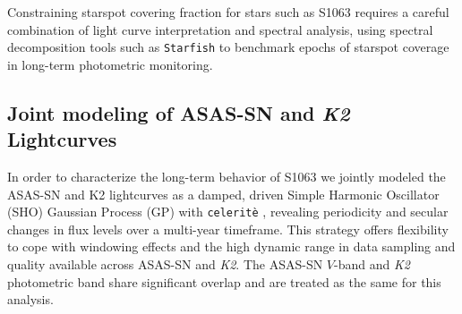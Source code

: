 \documentclass[modern,trackchanges]{aastex631}
\begin{document}

Constraining starspot covering fraction for stars such as S1063 requires a careful combination of light curve interpretation and spectral analysis, using spectral decomposition tools such as \texttt{Starfish} \citep{czekala15} to benchmark epochs of starspot coverage in long-term photometric monitoring. 

\subsection{Joint modeling of ASAS-SN and \emph{K2} Lightcurves}
In order to characterize the long-term behavior of S1063 we jointly modeled the ASAS-SN and K2 lightcurves as a damped, driven Simple Harmonic Oscillator (SHO) Gaussian Process (GP) with \texttt{celerit\`e} \citep{2017AJ....154..220F}, revealing periodicity and secular changes in flux levels over a multi-year timeframe.  This strategy offers flexibility to cope with windowing effects and the high dynamic range in data sampling and quality available across ASAS-SN and \emph{K2}.  The ASAS-SN $V$-band and \emph{K2} photometric band share significant overlap and are treated as the same for this analysis. 
\end{document}
